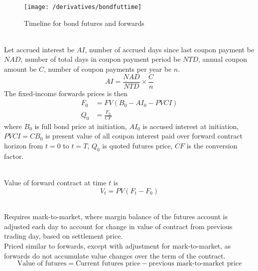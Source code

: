 \begin{figure}[H]
\centering
\texttt{[image: /derivatives/bondfuttime]}
\caption{Timeline for bond futures and forwards}
\end{figure}

\begin{method} \\
Let accrued interest be $AI$, number of accrued days since last coupon payment be $NAD$, number of total days in coupon payment period be $NTD$, annual coupon amount be $C$, number of coupon payments per year be $n$.
\begin{equation}
AI = \frac{NAD}{NTD} \times \frac{C}{n} \nonumber
\end{equation}
The fixed-income forwards prices is then
\begin{align}
F_0 &= FV(B_0 - AI_0 - PVCI) \nonumber \\
Q_0 &= \frac{F_0}{CF} \nonumber
\end{align}
where $B_0$ is full bond price at initiation, $AI_0$ is accused interest at initiation, $PVCI = CB_0$ is present value of all coupon interest paid over forward contract horizon from $t = 0$ to $t = T$, $Q_0$ is quoted futures price, $CF$ is the conversion factor.
\end{method}

\begin{method} \\
Value of forward contract at time $t$ is
\begin{equation}
V_t = PV(F_t - F_0) \nonumber
\end{equation}
\end{method}

\begin{remark} \\
Requires mark-to-market, where margin balance of the futures account is adjusted each day to account for change in value of contract from previous trading day, based on settlement price.\\
Priced similar to forwards, except with adjustment for mark-to-market, as forwards do not accumulate value changes over the term of the contract.
\begin{equation}
\text{Value of futures} = \text{Current futures price} - \text{previous mark-to-market price} \nonumber
\end{equation}
\end{remark}

